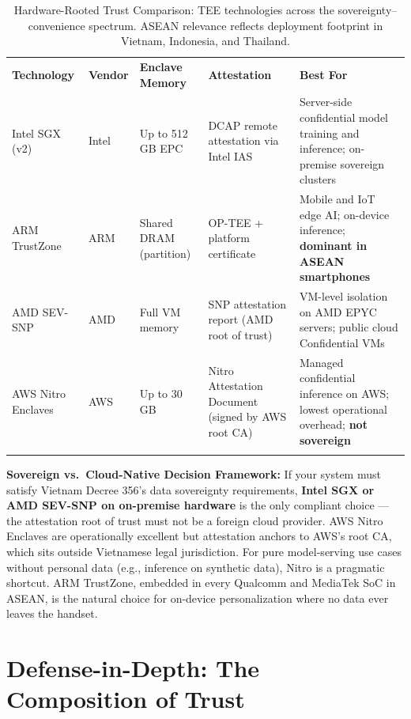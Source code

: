 \begin{table}[ht]
\centering
\caption{Hardware-Rooted Trust Comparison: TEE technologies across the sovereignty--convenience spectrum. ASEAN relevance reflects deployment footprint in Vietnam, Indonesia, and Thailand.}
\label{tab:tee_comparison}
\renewcommand{\arraystretch}{1.3}
\begin{tabular}{p{2.4cm} p{1.5cm} p{2.2cm} p{2.2cm} p{3.3cm}}
\hline\noalign{\smallskip}
\textbf{Technology} & \textbf{Vendor} & \textbf{Enclave Memory} & \textbf{Attestation} & \textbf{Best For} \\
\noalign{\smallskip}\svhline\noalign{\smallskip}
Intel SGX (v2) & Intel & Up to 512\,GB EPC & DCAP remote attestation via Intel IAS & Server-side confidential model training and inference; on-premise sovereign clusters \\[3pt]
ARM TrustZone & ARM & Shared DRAM (partition) & OP-TEE + platform certificate & Mobile and IoT edge AI; on-device inference; \textbf{dominant in ASEAN smartphones} \\[3pt]
AMD SEV-SNP & AMD & Full VM memory & SNP attestation report (AMD root of trust) & VM-level isolation on AMD EPYC servers; public cloud Confidential VMs \\[3pt]
\rowcolor{patternbg}
AWS Nitro Enclaves & AWS & Up to 30\,GB & Nitro Attestation Document (signed by AWS root CA) & Managed confidential inference on AWS; lowest operational overhead; \textbf{not sovereign} \\
\noalign{\smallskip}\hline\noalign{\smallskip}
\end{tabular}
\end{table}

\begin{svgraybox}
\textbf{Sovereign vs.\ Cloud-Native Decision Framework:} If your system must satisfy Vietnam Decree 356's data sovereignty requirements, \textbf{Intel SGX or AMD SEV-SNP on on-premise hardware} is the only compliant choice — the attestation root of trust must not be a foreign cloud provider. AWS Nitro Enclaves are operationally excellent but attestation anchors to AWS's root CA, which sits outside Vietnamese legal jurisdiction. For pure model-serving use cases without personal data (e.g., inference on synthetic data), Nitro is a pragmatic shortcut. ARM TrustZone, embedded in every Qualcomm and MediaTek SoC in ASEAN, is the natural choice for on-device personalization where no data ever leaves the handset.
\end{svgraybox}

\section{Defense-in-Depth: The Composition of Trust}
\label{sec:tee_composition}

